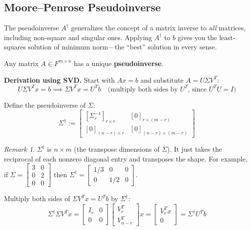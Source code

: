 \documentclass[11pt]{article}
\theoremstyle{definition}
\theoremstyle{plain}
\theoremstyle{remark}
\newtheorem{remark}[definition]{Remark}
\begin{document}
\subsection{Moore--Penrose Pseudoinverse}

\begin{intuitionbox}
The pseudoinverse $A^\dagger$ generalizes the concept of a matrix inverse to \textit{all} matrices, including non-square and singular ones. Applying $A^\dagger$ to $b$ gives you the least-squares solution of minimum norm---the ``best'' solution in every sense.
\end{intuitionbox}

Any matrix $A \in F^{m \times n}$ has a unique \textbf{pseudoinverse}.

\textbf{Derivation using SVD.} Start with $Ax = b$ and substitute $A = U\Sigma V^T$:
\[
U\Sigma V^T x = b \implies \Sigma V^T x = U^T b \quad \text{(multiply both sides by $U^T$, since $U^T U = I$)}
\]

Define the pseudoinverse of $\Sigma$:
\[
\Sigma^\dagger := \begin{bmatrix} [\Sigma_r^{-1}]_{r \times r} & [0]_{r \times (m-r)} \\ [0]_{(n-r) \times r} & [0]_{(n-r) \times (m-r)} \end{bmatrix}
\]

\begin{remark}
$\Sigma^\dagger$ is $n \times m$ (the transpose dimensions of $\Sigma$). It just takes the reciprocal of each nonzero diagonal entry and transposes the shape. For example, if $\Sigma = \begin{bmatrix}3 & 0\\0 & 2\\0 & 0\end{bmatrix}$ then $\Sigma^\dagger = \begin{bmatrix}1/3 & 0 & 0\\0 & 1/2 & 0\end{bmatrix}$.
\end{remark}

Multiply both sides of $\Sigma V^T x = U^T b$ by $\Sigma^\dagger$:
\[
\Sigma^\dagger \Sigma V^T x = \begin{bmatrix} I_{r} & 0 \\ 0 & 0 \end{bmatrix} \begin{bmatrix} V_r^T \\ V_{n-r}^T \end{bmatrix} x = \begin{bmatrix} V_r^T x \\ 0 \end{bmatrix} = \Sigma^\dagger U^T b
\]
\end{document}
